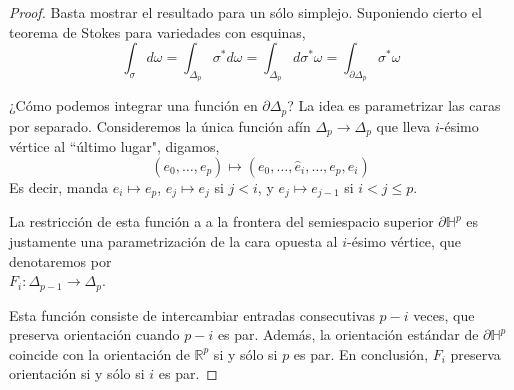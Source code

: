 \documentclass[spanish]{article}
\theoremstyle{definition}
\newcommand{\R}{\mathbb{R}}
\begin{document}
	\begin{proof}
		Basta mostrar el resultado para un sólo simplejo. Suponiendo cierto el teorema de Stokes para variedades con esquinas,
		\[\int_{\sigma}d\omega=\int_{\Delta_p}\sigma^*d\omega=\int_{\Delta_p}d\sigma^*\omega=\int_{\partial \Delta_p}\sigma^*\omega\]
		
		¿Cómo podemos integrar una función en $\partial\Delta_p$? La idea es parametrizar las caras por separado. Consideremos la única función afín $\Delta_p\to\Delta_p$ que lleva $i$-ésimo vértice al ``último lugar", digamos,
		\[(e_0,\ldots,e_p)\mapsto (e_0,\ldots,\hat{e}_i,\ldots,e_p,e_i)\]
		Es decir, manda $e_i\mapsto e_p$, $e_j\mapsto e_j$ si $j<i$, y $e_j\mapsto e_{j-1}$ si $i<j\leq p$.
		
		La restricción de esta función a a la frontera del semiespacio superior $\partial\mathbb{H}^p$ es justamente una parametrización de la cara opuesta al $i$-ésimo vértice, que denotaremos por\\ $F_{i}:\Delta_{p-1}\to\Delta_p$.
		
		Esta función consiste de intercambiar entradas consecutivas $p-i$ veces, que preserva orientación cuando $p-i$ es par. Además, la orientación estándar de $\partial\mathbb{H}^p$ coincide con la orientación de $\R^p$ si y sólo si $p$ es par. En conclusión, $F_i$ preserva orientación si y sólo si $i$ es par.
		
		
		

	
		

\end{proof}
\end{document}
